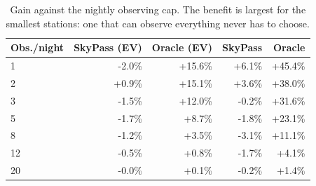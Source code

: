 \begin{table}[t]
\caption{Gain against the nightly observing cap. The benefit is largest for the smallest stations: one that can observe everything never has to choose.}
\label{tab:capsweep}
\centering
\setlength{\tabcolsep}{4pt}
\begin{tabular}{lrrrr}
\toprule
Obs./night & SkyPass (EV) & Oracle (EV) & SkyPass & Oracle \\
\midrule
1 & -2.0\% & +15.6\% & +6.1\% & +45.4\% \\
2 & +0.9\% & +15.1\% & +3.6\% & +38.0\% \\
3 & -1.5\% & +12.0\% & -0.2\% & +31.6\% \\
5 & -1.7\% & +8.7\% & -1.8\% & +23.1\% \\
8 & -1.2\% & +3.5\% & -3.1\% & +11.1\% \\
12 & -0.5\% & +0.8\% & -1.7\% & +4.1\% \\
20 & -0.0\% & +0.1\% & -0.2\% & +1.4\% \\
\bottomrule
\end{tabular}
\end{table}

